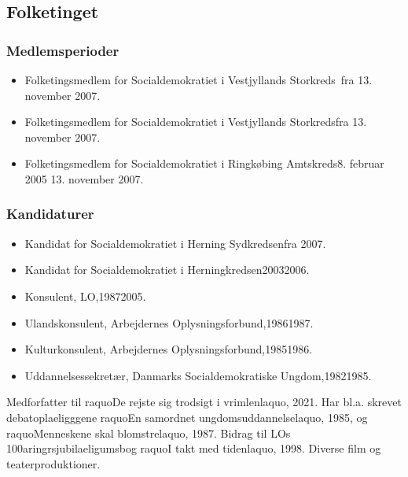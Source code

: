 \documentclass[11pt, a4paper]{awesome-cv}
\begin{document}
\begin{cvletter}
\subsection*{Folketinget}
\subsubsection*{Medlemsperioder}
\begin{itemize}
\item Folketingsmedlem for Socialdemokratiet i Vestjyllands Storkreds fra 13. november 2007.
\item Folketingsmedlem for Socialdemokratiet i Vestjyllands Storkredsfra 13. november 2007.
\item Folketingsmedlem for Socialdemokratiet i Ringkøbing Amtskreds8. februar 2005  13. november 2007.
\end{itemize}
\subsubsection*{Kandidaturer}
\begin{itemize}
\item Kandidat for Socialdemokratiet i Herning Sydkredsenfra 2007.
\item Kandidat for Socialdemokratiet i Herningkredsen20032006.
\end{itemize}
\begin{itemize}
\item Konsulent, LO,19872005.
\item Ulandskonsulent, Arbejdernes Oplysningsforbund,19861987.
\item Kulturkonsulent, Arbejdernes Oplysningsforbund,19851986.
\item Uddannelsessekretær, Danmarks Socialdemokratiske Ungdom,19821985.
\end{itemize}
Medforfatter til raquoDe rejste sig trodsigt i vrimlenlaquo, 2021. Har bl.a. skrevet debatoplaeligggene raquoEn samordnet ungdomsuddannelselaquo, 1985, og raquoMenneskene skal blomstrelaquo, 1987. Bidrag til LOs 100aringrsjubilaeligumsbog raquoI takt med tidenlaquo, 1998. Diverse film og teaterproduktioner.

\end{cvletter}
\end{document}
